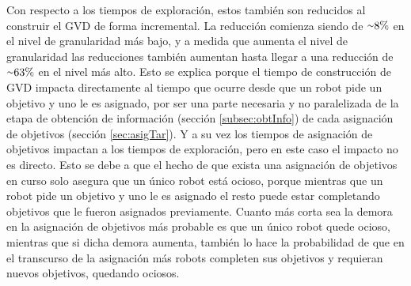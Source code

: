 
Con respecto a los tiempos de exploración, estos también son reducidos al
construir el GVD de forma incremental. La reducción comienza siendo de
${\smallsim}8\%$ en el nivel de granularidad más bajo, y a medida que aumenta el
nivel de granularidad las reducciones también aumentan hasta llegar a una
reducción de ${\smallsim}63\%$ en el nivel más alto. Esto se explica porque el
tiempo de construcción de GVD impacta directamente al tiempo que ocurre desde
que un robot pide un objetivo y uno le es asignado, por ser una parte necesaria y
no paralelizada de la etapa de obtención de información (sección
\ref{subsec:obtInfo}) de cada asignación de objetivos (sección
\ref{sec:asigTar}). Y a su vez los tiempos de asignación de objetivos impactan
a los tiempos de exploración, pero en este caso el impacto no es directo. Esto
se debe a que el hecho de que exista una asignación de objetivos en curso solo
asegura que un único robot está ocioso, porque mientras que un robot pide un
objetivo y uno le es asignado el resto puede estar completando objetivos que le
fueron asignados previamente. Cuanto más corta sea la demora en la asignación
de objetivos más probable es que un único robot quede ocioso, mientras que si
dicha demora aumenta, también lo hace la probabilidad de que en el transcurso de
la asignación más robots completen sus objetivos y requieran nuevos objetivos,
quedando ociosos. 

